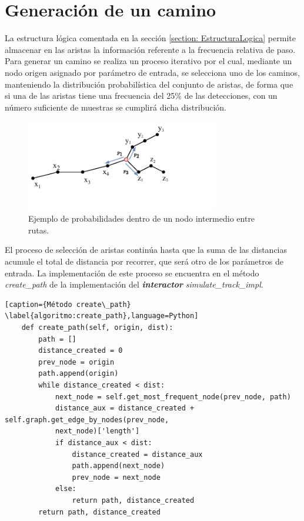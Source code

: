\section{Generación de un camino}
La estructura lógica comentada en la sección \ref{section: EstructuraLogica} permite 
almacenar en las aristas la información referente a la frecuencia relativa de paso.
Para generar un camino se realiza un proceso iterativo por el cual, mediante un nodo 
origen asignado por parámetro de entrada, se selecciona uno de los caminos, 
manteniendo la distribución probabilística del conjunto de aristas, de forma que si una 
de las aristas tiene una frecuencia del 25\% de las detecciones, con un número 
suficiente de muestras se cumplirá dicha distribución. 
\begin{figure}[!htb]
\begin{center}
\includegraphics[width=0.75\textwidth]{./Imagenes/SimulationProbabilities}
\caption{Ejemplo de probabilidades dentro de un nodo intermedio entre rutas.}
\label{figure:PointGeneration02}
\end{center}
\end{figure}

El proceso de selección de aristas continúa hasta que la suma de las distancias 
acumule el total de distancia por recorrer, que será otro de los parámetros de entrada.
La implementación de este proceso se encuentra en el método \textit{create\_path} de 
la implementación del \textbf{\textit{interactor}} \textit{simulate\_track\_impl}.

\begin{lstlisting}[caption={Método create\_path}
\label{algoritmo:create_path},language=Python] 
    def create_path(self, origin, dist):
        path = []
        distance_created = 0
        prev_node = origin
        path.append(origin)
        while distance_created < dist:
            next_node = self.get_most_frequent_node(prev_node, path)
            distance_aux = distance_created + self.graph.get_edge_by_nodes(prev_node, 
            next_node)['length']
            if distance_aux < dist:
                distance_created = distance_aux
                path.append(next_node)
                prev_node = next_node
            else:
                return path, distance_created
        return path, distance_created
\end{lstlisting}


